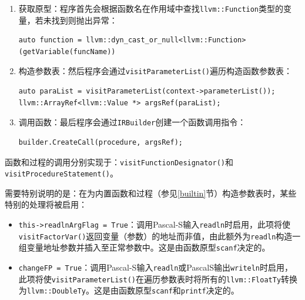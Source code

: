\documentclass[lang=cn,11pt,a4paper,cite=authornum]{paper}
\begin{document}
\begin{enumerate}
    \item 获取原型：程序首先会根据函数名在作用域中查找\texttt{llvm::Function}类型的变量，若未找到则抛出异常：
          \begin{code}
              \begin{verbatim}
auto function = llvm::dyn_cast_or_null<llvm::Function>(getVariable(funcName))
    \end{verbatim}
          \end{code}
    \item 构造参数表：然后程序会通过\texttt{visitParameterList()}遍历构造函数参数表：
          \begin{code}
              \begin{verbatim}
auto paraList = visitParameterList(context->parameterList());
llvm::ArrayRef<llvm::Value *> argsRef(paraList);
    \end{verbatim}
          \end{code}
    \item 调用函数：最后程序会通过\texttt{IRBuilder}创建一个函数调用指令：
          \begin{code}
              \begin{verbatim}
builder.CreateCall(procedure, argsRef);
    \end{verbatim}
          \end{code}
\end{enumerate}

函数和过程的调用分别实现于：\texttt{visitFunctionDesignator()}和\texttt{visitProcedureStatement()}。

需要特别说明的是：在为内置函数和过程（参见\ref{builtin}节）构造参数表时，某些特别的处理将被启用：

\begin{itemize}
    \item \texttt{this->readlnArgFlag = True}：调用Pascal-S输入\texttt{readln}时启用，此项将使\texttt{visitFactorVar()}返回变量（参数）的地址而非值，由此额外为\texttt{readln}构造一组变量地址参数并插入至正常参数中。这是由函数原型\texttt{scanf}决定的。
    \item \texttt{changeFP = True}：调用Pascal-S输入\texttt{readln}或PascalS输出\texttt{writeln}时启用，此项将使\texttt{visitParameterList()}在遍历参数表时将所有的\texttt{llvm::FloatTy}转换为\texttt{llvm::DoubleTy}。这是由函数原型\texttt{scanf}和\texttt{printf}决定的。
\end{itemize}
\end{document}
